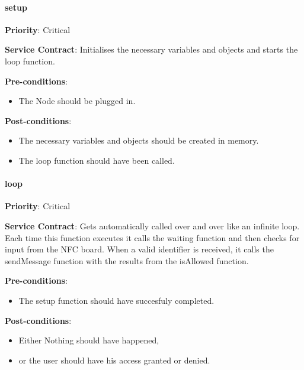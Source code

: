 		\paragraph{setup}
			\begin{description}
			    \item{\textbf{Priority}:} Critical%
			    \item{\textbf{Service Contract}:} Initialises the necessary variables and objects and starts the loop function. 
			    \item{\textbf{Pre-conditions}:}%
    			    \begin{itemize}
    			        \item The Node should be plugged in.
    			    \end{itemize}
			    \item{\textbf{Post-conditions}:} %
    			    \begin{itemize}
    			        \item The necessary variables and objects should be created in memory.
    			        \item The loop function should have been called.
    			    \end{itemize}
			\end{description}


		 \paragraph{loop}
			\begin{description}
			    \item{\textbf{Priority}:} Critical%
			    \item{\textbf{Service Contract}:} Gets automatically called over and over like an infinite loop. Each time this function executes it calls the waiting function and then checks for input from the NFC board. When a valid identifier is received, it calls the sendMessage function with the results from the isAllowed function.
			    \item{\textbf{Pre-conditions}:}%
    			    \begin{itemize}
    			        \item The setup function should have succesfuly completed.
    			    \end{itemize}
			    \item{\textbf{Post-conditions}:} %
    			    \begin{itemize}
    			        \item Either Nothing should have happened,
    			        \item or the user should have his access granted or denied.
    			    \end{itemize}
			\end{description}

		